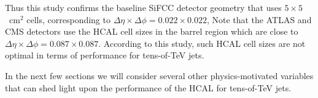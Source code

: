 Thus this study confirms the  baseline SiFCC detector geometry \cite{Chekanov:2016ppq}
that uses $5\times 5$~cm$^2$ cells,
corresponding to $\Delta \eta \times \Delta \phi = 0.022\times0.022$,
Note that the ATLAS and CMS detectors use the HCAL cell sizes in the barrel region which are close to 
$\Delta \eta \times \Delta \phi = 0.087\times 0.087$.  According to this study,
such HCAL cell sizes are not optimal in terms of performance  for tens-of-TeV jets.

In the next few sections we will consider several other physics-motivated
variables that can shed light  upon the performance of the HCAL for tens-of-TeV jets.

\begin{figure}
\begin{center}
\end{center}
\end{figure}
